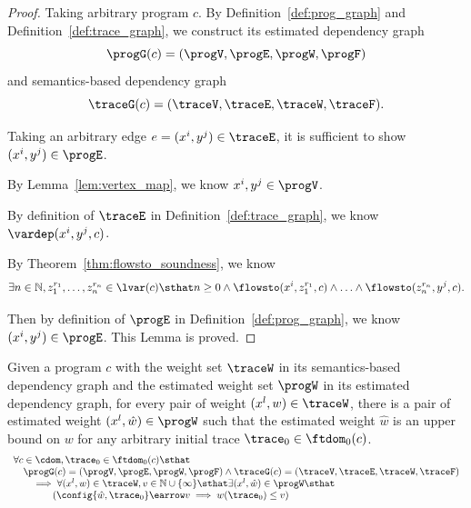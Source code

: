 \begin{proof}
	Taking arbitrary program $c$.
	By Definition~\ref{def:prog_graph} and Definition~\ref{def:trace_graph}, 
	we construct
	its estimated dependency graph 
	$$\progG({c}) = (\progV, \progE, \progW, \progF)$$
	and 
	semantics-based dependency graph 
	$$\traceG({c}) = (\traceV, \traceE, \traceW, \traceF).$$

Taking an arbitrary edge $e = (x^i, y^j) \in \traceE$, it is sufficient to show $(x^i, y^j) \in \progE$.

By Lemma~\ref{lem:vertex_map}, we know $x^i, y^j \in \progV$.

By definition of $\traceE$ in Definition~\ref{def:trace_graph}, we know $\vardep(x^i, y^j, c)$.

By Theorem~\ref{thm:flowsto_soundness}, we know 
\[
	\exists n \in \mathbb{N}, z_1^{r_1}, \ldots, z_n^{r_n} \in \lvar(c)\sthat  
n \geq 0 \land
\flowsto(x^i,  z_1^{r_1}, c) 
\land \ldots \land \flowsto(z_n^{r_n}, y^j, c).
\]

Then by definition of $\progE$ in Definition~\ref{def:prog_graph}, we know $(x^i, y^j) \in \progE$. This Lemma is proved.
\end{proof}
%
\begin{lem}
	\label{lem:weights_map}
	Given a program $c$ with the weight set $\traceW$ in its
	semantics-based dependency graph 
	and the estimated weight set $\progW$ in its
	estimated dependency graph, 
	for every pair of weight $(x^l, w) \in \traceW$, 
	there is a pair of estimated weight $(x^l, \hat{w}) \in \progW$ 
	such that the estimated weight $\hat{w}$ is an upper bound on $w$ for any arbitrary
	initial trace $\trace_0 \in \ftdom_0(c) $.
	\[
		\begin{array}{l}
			\forall c \in \cdom, \trace_0 \in \ftdom_0(c) 
			 \sthat  
			 \\ \quad
			 \progG({c}) = (\progV, \progE, \progW, \progF)
			 \land 
			\traceG({c}) = (\traceV, \traceE, \traceW, \traceF)
			\\ \qquad
			\implies
			\forall (x^l, w) \in \traceW , v \in \mathbb{N} \cup\{ \infty\}
			\sthat
			\exists (x^l, \hat{w}) \in \progW
			\sthat 
			\\ \qquad \qquad
			(\config{\hat{w}, \trace_0} \earrow v
			\implies
			w(\trace_0) \leq v)
		\end{array}
		\]
	\end{lem}
